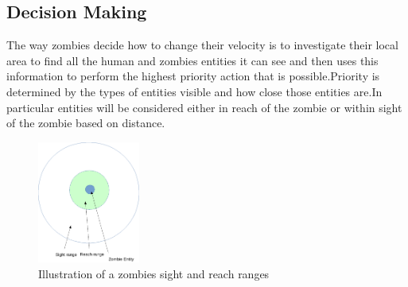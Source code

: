 \subsection{Decision Making}
The way zombies decide how to change their velocity is to investigate their local area to find all the human and zombies entities it can see and then uses this information to perform the highest priority action that is possible.Priority is determined by the types of entities visible and how close those entities are.In particular entities will be considered either in reach of the zombie or within sight of the zombie based on distance.
\begin{figure}[h]
  \centering
  \includegraphics[width=0.3\textwidth]{img/zombie_range.png}
\caption{Illustration of a zombies sight and reach ranges}
    \label{fig:Illustration of a zombies sight and reach ranges}
\end{figure}
